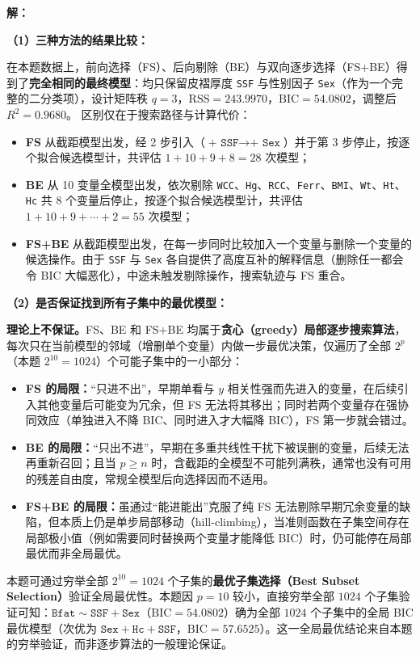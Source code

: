 \documentclass[12pt,a4paper]{article}
\begin{document}
\begin{answerbox}
\textbf{解：}

\textbf{（1）三种方法的结果比较：}

在本题数据上，前向选择（FS）、后向剔除（BE）与双向逐步选择（FS+BE）得到了\textbf{完全相同的最终模型}：均只保留皮褶厚度 \texttt{SSF} 与性别因子 \texttt{Sex}（作为一个完整的二分类项），设计矩阵秩 $q=3$，$\mathrm{RSS}=243.9970$，$\mathrm{BIC}=54.0802$，调整后 $R^2=0.9680$。
区别仅在于搜索路径与计算代价：
\begin{itemize}
\item \textbf{FS} 从截距模型出发，经 2 步引入（$\texttt{+ SSF}\to\texttt{+ Sex}$）并于第 3 步停止，按逐个拟合候选模型计，共评估 $1+10+9+8=28$ 次模型；
\item \textbf{BE} 从 10 变量全模型出发，依次剔除 \texttt{WCC}、\texttt{Hg}、\texttt{RCC}、\texttt{Ferr}、\texttt{BMI}、\texttt{Wt}、\texttt{Ht}、\texttt{Hc} 共 8 个变量后停止，按逐个拟合候选模型计，共评估 $1+10+9+\cdots+2=55$ 次模型；
\item \textbf{FS+BE} 从截距模型出发，在每一步同时比较加入一个变量与删除一个变量的候选操作。由于 \texttt{SSF} 与 \texttt{Sex} 各自提供了高度互补的解释信息（删除任一都会令 $\mathrm{BIC}$ 大幅恶化），中途未触发剔除操作，搜索轨迹与 FS 重合。
\end{itemize}

\textbf{（2）是否保证找到所有子集中的最优模型：}

\textbf{理论上不保证。}FS、BE 和 FS+BE 均属于\textbf{贪心（greedy）局部逐步搜索算法}，每次只在当前模型的邻域（增删单个变量）内做一步最优决策，仅遍历了全部 $2^p$（本题 $2^{10}=1024$）个可能子集中的一小部分：
\begin{itemize}
\item \textbf{FS 的局限：}``只进不出''，早期单看与 $y$ 相关性强而先进入的变量，在后续引入其他变量后可能变为冗余，但 FS 无法将其移出；同时若两个变量存在强协同效应（单独进入不降 BIC、同时进入才大幅降 BIC），FS 第一步就会错过。
\item \textbf{BE 的局限：}``只出不进''，早期在多重共线性干扰下被误删的变量，后续无法再重新召回；且当 $p\ge n$ 时，含截距的全模型不可能列满秩，通常也没有可用的残差自由度，常规全模型后向选择因而不适用。
\item \textbf{FS+BE 的局限：}虽通过``能进能出''克服了纯 FS 无法剔除早期冗余变量的缺陷，但本质上仍是单步局部移动（hill-climbing），当准则函数在子集空间存在局部极小值（例如需要同时替换两个变量才能降低 BIC）时，仍可能停在局部最优而非全局最优。
\end{itemize}
本题可通过穷举全部 $2^{10}=1024$ 个子集的\textbf{最优子集选择（Best Subset Selection）}验证全局最优性。本题因 $p=10$ 较小，直接穷举全部 $1024$ 个子集验证可知：$\texttt{Bfat}\sim\texttt{SSF}+\texttt{Sex}$（$\mathrm{BIC}=54.0802$）确为全部 $1024$ 个子集中的全局 BIC 最优模型（次优为 $\texttt{Sex}+\texttt{Hc}+\texttt{SSF}$，$\mathrm{BIC}=57.6525$）。这一全局最优结论来自本题的穷举验证，而非逐步算法的一般理论保证。
\end{answerbox}
\end{document}
